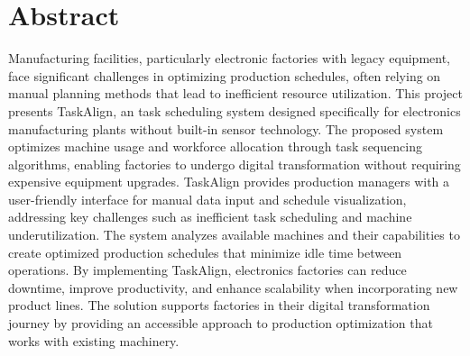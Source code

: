 \chapter*{Abstract}
\label{chap:abstract}

Manufacturing facilities, particularly electronic factories with legacy equipment, face significant challenges in optimizing production schedules, often relying on manual planning methods that lead to inefficient resource utilization. This project presents TaskAlign, an task scheduling system designed specifically for electronics manufacturing plants without built-in sensor technology. The proposed system optimizes machine usage and workforce allocation through task sequencing algorithms, enabling factories to undergo digital transformation without requiring expensive equipment upgrades.
TaskAlign provides production managers with a user-friendly interface for manual data input and schedule visualization, addressing key challenges such as inefficient task scheduling and machine underutilization. The system analyzes available machines and their capabilities to create optimized production schedules that minimize idle time between operations. By implementing TaskAlign, electronics factories can reduce downtime, improve productivity, and enhance scalability when incorporating new product lines. The solution supports factories in their digital transformation journey by providing an accessible approach to production optimization that works with existing machinery.